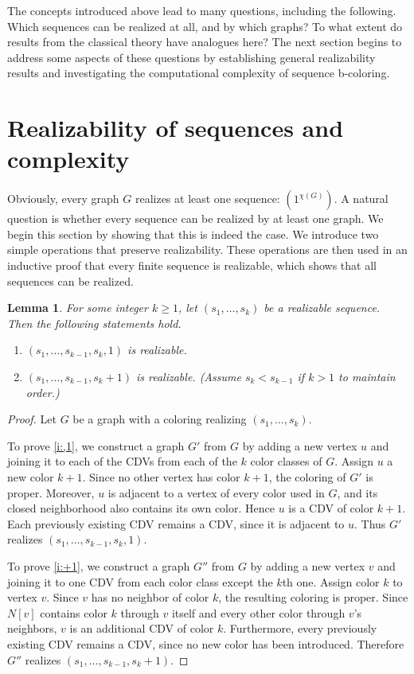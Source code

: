\documentclass{article}
\newtheorem{lemma}[theorem]{Lemma}
\theoremstyle{definition}
\begin{document}
The concepts introduced above lead to many questions, including the following.
Which sequences can be realized at all, and by which graphs?
To what extent do results from the classical theory have analogues here?
The next section begins to address some aspects of these questions by establishing general realizability results and investigating the computational complexity of sequence b-coloring.

\section{Realizability of sequences and complexity}

Obviously, every graph $G$ realizes at least one sequence: $(1^{\chi(G)})$.
A natural question is whether every sequence can be realized by at least one graph. 
We begin this section by showing that this is indeed the case. 
We introduce two simple operations that preserve realizability. 
These operations are then used in an inductive proof that every finite sequence is realizable, which shows that all sequences can be realized.

\begin{lemma}\label{l:satIter}
For some integer $k\ge1$, let $(s_1,\ldots,s_k)$ be a realizable sequence.
Then the following statements hold.
\begin{enumerate}
    \item $(s_1,\ldots,s_{k-1},s_k,1)$ is realizable. \label{i:,1}
    \item $(s_1,\ldots,s_{k-1},s_k+1)$ is realizable. (Assume $s_k<s_{k-1}$ if $k>1$ to maintain order.) \label{i:+1}
\end{enumerate}
\end{lemma}

\begin{proof}
Let $G$ be a graph with a coloring realizing $(s_1,\ldots,s_k)$.

To prove \ref{i:,1}, we construct a graph $G'$ from $G$ by adding a new vertex $u$ and joining it to each of the CDVs from each of the $k$ color classes of $G$. Assign $u$ a new color $k+1$. Since no other vertex has color $k+1$, the coloring of $G'$ is proper. Moreover, $u$ is adjacent to a vertex of every color used in $G$, and its closed neighborhood also contains its own color. Hence $u$ is a CDV of color $k+1$. Each previously existing CDV remains a CDV, since it is adjacent to $u$. Thus $G'$ realizes $(s_1,\ldots,s_{k-1},s_k,1)$.

To prove \ref{i:+1}, we construct a graph $G''$ from $G$ by adding a new vertex $v$ and joining it to one CDV from each color class except the $k$th one. Assign color $k$ to vertex $v$. Since $v$ has no neighbor of color $k$, the resulting coloring is proper. Since $N[v]$ contains color $k$ through $v$ itself and every other color through $v$'s neighbors, $v$ is an additional CDV of color $k$. Furthermore, every previously existing CDV remains a CDV, since no new color has been introduced. Therefore $G''$ realizes $(s_1,\ldots,s_{k-1},s_k+1)$.
\end{proof}
\end{document}
